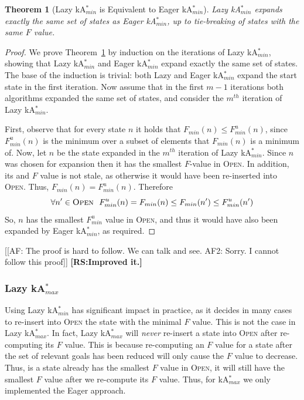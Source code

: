 \documentclass{aicom2e}
\newtheorem{theorem}{Theorem}
\newcommand{\kastarmin}{kA$^*_{min}$}
\newcommand{\kastarmax}{kA$^*_{max}$}
\newcommand{\open}{\textsc{Open}}
\newcommand{\roni}[1]{\textbf{[RS:#1]}}
\begin{document}
\begin{theorem}[Lazy \kastarmin{} is Equivalent to Eager \kastarmin{}]
Lazy \kastarmin{} expands exactly the same set of states as Eager \kastarmin{}, up to tie-breaking of states with the same $F$ value. 
\label{the:lazy-minf-correct}
\end{theorem}
\begin{proof}
We prove Theorem~\ref{the:lazy-minf-correct} by induction on the iterations
of Lazy \kastarmin{}, showing that Lazy \kastarmin{} and Eager \kastarmin{} expand exactly the same set of states. 
The base of the induction is trivial: both Lazy and Eager \kastarmin{} expand the start state in the first iteration. 
Now assume that in the first $m-1$ iterations both algorithms expanded the same set of states, 
and consider the $m^{th}$ iteration of Lazy \kastarmin{}. 

First, observe that for every state $n$ it holds that $F_{min}(n)\leq F^u_{min}(n)$, since $F^u_{min}(n)$ is the minimum over a subset of elements that $F_{min}(n)$ is a minimum of. 
Now, let $n$ be the state expanded in the $m^{th}$ iteration of Lazy \kastarmin{}. 
Since $n$ was chosen for expansion then it has the smallest $F$-value in \open{}. 
In addition, its and $F$ value is not stale, as otherwise it
would have been re-inserted into \open{}. Thus, $F_{min}(n)=F^u_{min}(n)$. 
Therefore
\[ \forall n'\in\open{} ~~ F^u_{min}(n)=F_{min}(n)\leq F_{min}(n') \leq F^u_{min}(n') \]
    So, $n$ has the smallest $F^u_{min}$ value in \open{}, and thus it would have also been expanded by Eager \kastarmin{}, as required. 
\end{proof}
[[AF: The proof is hard to follow. We can talk and see. AF2: Sorry. I cannot
follow this proof]]
\roni{Improved it.}




\subsubsection{Lazy \kastarmax{}}
Using Lazy \kastarmin{} has significant impact in practice, as it decides
in many cases to re-insert into \open{} the state with the minimal $F$ value. This is not the case in Lazy \kastarmax{}. In fact, Lazy \kastarmax{} will {\em never} re-insert a state into \open{} after re-computing its $F$ value. 
This is because re-computing an $F$ value for a state after the set of relevant goals has been reduced will only cause the $F$ value to decrease. Thus, is a state already has the smallest $F$ value in \open{}, it will still have the smallest $F$ value after we re-compute its $F$ value. 
Thus, for \kastarmax{} we only implemented the Eager approach. 
\end{document}
